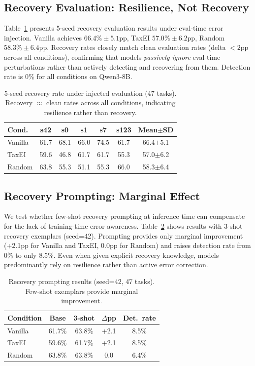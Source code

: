 \documentclass[11pt,a4paper]{article}
\begin{document}
\subsection{Recovery Evaluation: Resilience, Not Recovery}
\label{sec:recovery}

Table~\ref{tab:recovery_5seed} presents 5-seed recovery evaluation results under eval-time error injection.
Vanilla achieves $66.4\%{\pm}5.1$pp, TaxEI $57.0\%{\pm}6.2$pp, Random $58.3\%{\pm}6.4$pp.
Recovery rates closely match clean evaluation rates (delta $< 2$pp across all conditions), confirming that models \emph{passively ignore} eval-time perturbations rather than actively detecting and recovering from them.
Detection rate is 0\% for all conditions on Qwen3-8B.

\begin{table}[t]
\centering
\small
\caption{5-seed recovery rate under injected evaluation (47 tasks). Recovery $\approx$ clean rates across all conditions, indicating resilience rather than recovery.}
\label{tab:recovery_5seed}
\begin{tabular}{lcccccc}
\toprule
\textbf{Cond.} & \textbf{s42} & \textbf{s0} & \textbf{s1} & \textbf{s7} & \textbf{s123} & \textbf{Mean$\pm$SD} \\
\midrule
Vanilla & 61.7 & 68.1 & 66.0 & 74.5 & 61.7 & 66.4$\pm$5.1 \\
TaxEI & 59.6 & 46.8 & 61.7 & 61.7 & 55.3 & 57.0$\pm$6.2 \\
Random & 63.8 & 55.3 & 51.1 & 55.3 & 66.0 & 58.3$\pm$6.4 \\
\bottomrule
\end{tabular}
\end{table}

\subsection{Recovery Prompting: Marginal Effect}
\label{sec:recovery_prompt}

We test whether few-shot recovery prompting at inference time can compensate for the lack of training-time error awareness.
Table~\ref{tab:recovery_prompt} shows results with 3-shot recovery exemplars (seed=42).
Prompting provides only marginal improvement (+2.1pp for Vanilla and TaxEI, 0.0pp for Random) and raises detection rate from 0\% to only 8.5\%.
Even when given explicit recovery knowledge, models predominantly rely on resilience rather than active error correction.

\begin{table}[t]
\centering
\small
\caption{Recovery prompting results (seed=42, 47 tasks). Few-shot exemplars provide marginal improvement.}
\label{tab:recovery_prompt}
\begin{tabular}{lcccc}
\toprule
\textbf{Condition} & \textbf{Base} & \textbf{3-shot} & \textbf{$\Delta$pp} & \textbf{Det.\ rate} \\
\midrule
Vanilla & 61.7\% & 63.8\% & +2.1 & 8.5\% \\
TaxEI & 59.6\% & 61.7\% & +2.1 & 8.5\% \\
Random & 63.8\% & 63.8\% & 0.0 & 6.4\% \\
\bottomrule
\end{tabular}
\end{table}
\end{document}
